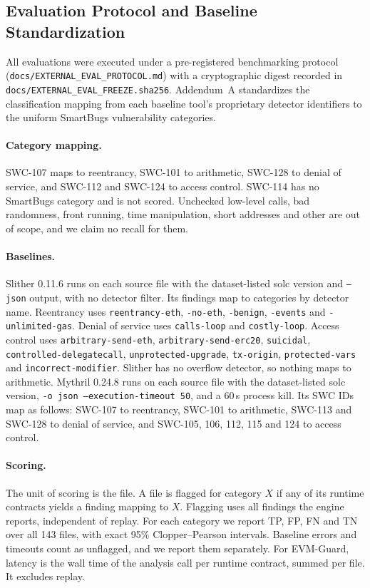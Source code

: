 \documentclass[pdflatex,sn-mathphys]{sn-jnl}
\theoremstyle{thmstyleone}
\theoremstyle{thmstyletwo}
\begin{document}
\subsection{Evaluation Protocol and Baseline Standardization}\label{sec:results:protocol}
All evaluations were executed under a pre-registered benchmarking protocol (\texttt{docs/EXTERNAL\_EVAL\_PROTOCOL.md}) with a cryptographic digest recorded in \texttt{docs/EXTERNAL\_EVAL\_FREEZE.sha256}. Addendum~A standardizes the classification mapping from each baseline tool's proprietary detector identifiers to the uniform SmartBugs vulnerability categories.

\paragraph{Category mapping.} SWC-107 maps to reentrancy, SWC-101 to arithmetic, SWC-128 to denial of service, and SWC-112 and SWC-124 to access control. SWC-114 has no SmartBugs category and is not scored. Unchecked low-level calls, bad randomness, front running, time manipulation, short addresses and other are out of scope, and we claim no recall for them.

\paragraph{Baselines.} Slither 0.11.6 runs on each source file with the dataset-listed solc version and \texttt{--json} output, with no detector filter. Its findings map to categories by detector name. Reentrancy uses \texttt{reentrancy-eth}, \texttt{-no-eth}, \texttt{-benign}, \texttt{-events} and \texttt{-unlimited-gas}. Denial of service uses \texttt{calls-loop} and \texttt{costly-loop}. Access control uses \texttt{arbitrary-send-eth}, \texttt{arbitrary-send-erc20}, \texttt{suicidal}, \texttt{controlled-delegatecall}, \texttt{unprotected-upgrade}, \texttt{tx-origin}, \texttt{protected-vars} and \texttt{incorrect-modifier}. Slither has no overflow detector, so nothing maps to arithmetic. Mythril 0.24.8 runs on each source file with the dataset-listed solc version, \texttt{-o json --execution-timeout 50}, and a 60\,s process kill. Its SWC IDs map as follows: SWC-107 to reentrancy, SWC-101 to arithmetic, SWC-113 and SWC-128 to denial of service, and SWC-105, 106, 112, 115 and 124 to access control.

\paragraph{Scoring.} The unit of scoring is the file. A file is flagged for category $X$ if any of its runtime contracts yields a finding mapping to $X$. Flagging uses all findings the engine reports, independent of replay. For each category we report TP, FP, FN and TN over all 143 files, with exact 95\% Clopper--Pearson intervals. Baseline errors and timeouts count as unflagged, and we report them separately. For EVM-Guard, latency is the wall time of the analysis call per runtime contract, summed per file. It excludes replay.
\end{document}
